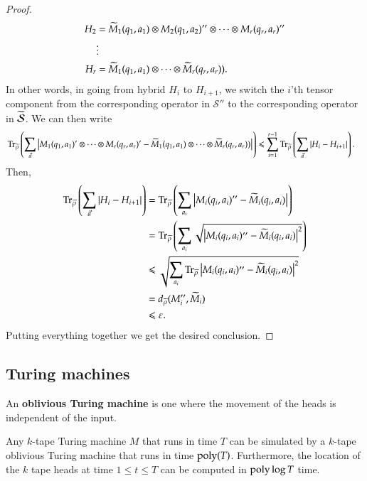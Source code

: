 \begin{proof}
\begin{align*}
		H_2 &= \widetilde{M}_1(q_1,a_1) \otimes M_2(q_1,a_2)'' \otimes \cdots \otimes M_r(q_r,a_r)'' \\
		&\vdots \\
		H_r &= \widetilde{M}_1(q_1,a_1) \otimes \cdots \otimes \widetilde{M}_r(q_r,a_r)).
	\end{align*}
	In other words, in going from hybrid $H_i$ to $H_{i+1}$, we switch the $i$'th tensor component from the corresponding operator in $\mathcal{S}''$ to the corresponding operator in $\widetilde{\mathcal{S}}$. We can then write
	\begin{align*}
		&\operatorname{Tr}_{\widetilde{\rho}} \left(\sum_{\vec{a}} \left\lvert M_1(q_1,a_1)' \otimes \cdots \otimes M_r(q_r,a_r)' - \widetilde{M}_1(q_1,a_1) \otimes \cdots \otimes \widetilde{M}_r(q_r,a_r))\right\rvert\right)  \leqslant \sum_{i=1}^{r-1} \operatorname{Tr}_{\widetilde{\rho}} \left(\sum_{\vec{a}} \left\lvert H_i - H_{i+1}\right\rvert\right).
	\end{align*}
	Then,
	\begin{align*}
	\operatorname{Tr}_{\widetilde{\rho}} \left(\sum_{\vec{a}} \left\lvert H_i - H_{i+1}\right\rvert\right) &= \operatorname{Tr}_{\widetilde{\rho}} \left(\sum_{a_i} \left\lvert M_i(q_i,a_i)'' - \widetilde{M}_i(q_i,a_i)\right\rvert\right) \\
	&= \operatorname{Tr}_{\widetilde{\rho}} \left(\sum_{a_i} \sqrt{\left\lvert M_i(q_i,a_i)'' - \widetilde{M}_i(q_i,a_i)\right\rvert^2} \right) \\
	&\leqslant \sqrt{\sum_{a_i} \operatorname{Tr}_{\widetilde{\rho}}  \left\lvert M_i(q_i,a_i)'' - \widetilde{M}_i(q_i,a_i)\right\rvert^2} \\
	&= d_{\widetilde{\rho}}(M_i'',\widetilde{M}_i) \\
	&\leqslant \varepsilon.
	\end{align*}
	Putting everything together we get the desired conclusion.
\end{proof}




\subsection{Turing machines}
\label{sec:turing_machines}

An \textbf{oblivious Turing machine} is one where the movement of the heads is independent of the input.

\begin{theorem}\label{thm:pippenger}
Any $k$-tape Turing machine $M$ that runs in time $T$ can be simulated by a $k$-tape oblivious Turing machine that runs in time $\operatorname{poly}(T)$. Furthermore, the location of the $k$ tape heads at time $1 \leq t \leq T$ can be computed in $\operatorname{poly} \log T$ time.
\end{theorem}


